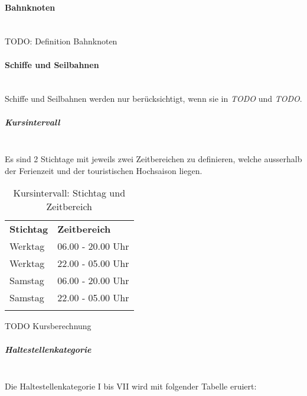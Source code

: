 \paragraph{Bahnknoten}~\\
TODO: Definition Bahnknoten

\paragraph{Schiffe und Seilbahnen}~\\
Schiffe und Seilbahnen werden nur berücksichtigt, wenn sie in \emph{TODO} und \emph{TODO}.


\subparagraph{Kursintervall}~\\
\label{Berechnungsmethodik OeVGK18:Kursintervall}
Es sind 2 Stichtage mit jeweils zwei Zeitbereichen zu definieren, welche ausserhalb der Ferienzeit und der touristischen Hochsaison liegen.

\begin{longtable}[c]{l l}
    \midrule
    \textbf{Stichtag}
                            & \textbf{Zeitbereich}\\
    Werktag
                            & 06.00 - 20.00 Uhr\\
    Werktag
                            & 22.00 - 05.00 Uhr\\
    Samstag
                            & 06.00 - 20.00 Uhr\\
    Samstag
                            & 22.00 - 05.00 Uhr\\
    \bottomrule
\caption{Kursintervall: Stichtag und Zeitbereich}
\label{table:Ermittlung Kursintervall: Stichtag und Zeitbereich}
\end{longtable}

TODO Kursberechnung

\subparagraph{Haltestellenkategorie}~\\
\label{Berechnungsmethodik OeVGK18:Haltestellenkategorie}
Die Haltestellenkategorie I bis VII wird mit folgender Tabelle eruiert:

